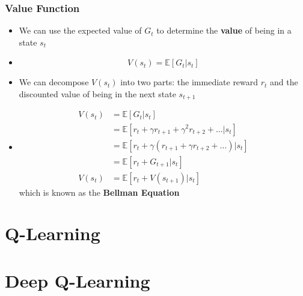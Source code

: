 \documentclass{beamer}
\begin{document}
\begin{frame}
  \frametitle{Value Function}
  \begin{itemize}
    \item We can use the expected value of $G_t$ to determine the \textbf{value} of being in a state $s_t$
    \item $$V(s_t) = \mathbb{E} \left[ G_t \vert s_t \right]$$
    \item We can decompose $V(s_t)$ into two parts: the immediate reward $r_t$ and the discounted value of being in the next state $s_{t+1}$
    \item \begin{align*}
          V(s_t) &= \mathbb{E} \left[ G_t \vert s_t \right] \\
           &= \mathbb{E} \left[ r_t + \gamma r_{t+1} + \gamma^2 r_{t+2} + \dots \vert s_t \right] \\
           &= \mathbb{E} \left[ r_t + \gamma( r_{t+1} + \gamma r_{t+2} + \dots ) \vert s_t \right] \\
           &= \mathbb{E} \left[ r_t + G_{t+1} \vert s_t \right] \\
          V(s_t) &= \mathbb{E} \left[ r_t + V(s_{t+1}) \vert s_t \right]
        \end{align*}
          which is known as the \textbf{Bellman Equation}
  \end{itemize}
\end{frame}

\section{Q-Learning}
\section{Deep Q-Learning}
\end{document}
